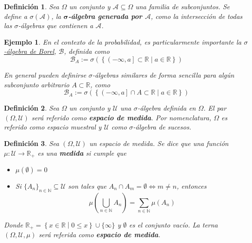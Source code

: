 \documentclass[12pt,letterpaper]{book}
\newtheorem{definicion}{Definición}[chapter]
\newtheorem{ejemplo}{Ejemplo}[chapter]
\newcommand{\R}{\mathbb{R}}
\newcommand{\talque}{\mathrel{}\middle|\mathrel{}}
\begin{document}
\begin{definicion}
Sea $\Omega$ un conjunto y $\mathcal{A} \subseteq \Omega$ una familia de subconjuntos. Se define a $\sigma(\mathcal{A})$, la \textbf{$\boldsymbol{\sigma}$-álgebra generada por $\boldsymbol{\mathcal{A}}$}, como la intersección de todas las $\sigma$-álgebras que contienen a $\mathcal{A}$.
\end{definicion}

\begin{ejemplo}
En el contexto de la probabilidad, es particularmente importante la \underline{$\sigma$-álgebra de Borel}, $\mathcal{B}$, definida como
\begin{equation}
\mathcal{B}_A := \sigma\left( \left\{ \left( -\infty , a \right] \subset \R \talque a\in \R \right\} \right)
\end{equation}

En general pueden definirse $\sigma$-álgebras similares de forma sencilla para algún subconjunto arbitrario $A \subset \R$, como
\begin{equation}
\mathcal{B}_A := \sigma\left( \left\{ \left( -\infty , a \right] \cap A \subset \R \talque a\in \R \right\} \right)
\end{equation}
\end{ejemplo}

\begin{definicion}
Sea $\Omega$ un conjunto y $\mathcal{U}$ una $\sigma$-álgebra definida en $\Omega$. El par $(\Omega,\mathcal{U})$ será referido como \textbf{espacio de medida}. Por nomenclatura, $\Omega$ es referido como \textit{espacio muestral} y $\mathcal{U}$ como \textit{$\sigma$-álgebra de sucesos}.
\end{definicion}

\begin{definicion}%
Sea $(\Omega, \mathcal{U})$ un espacio de medida. Se dice que una función $\mu : \mathcal{U} \rightarrow \R_+$ es una \textbf{medida} si cumple que
\begin{itemize}
\item $\mu(\emptyset) = 0$
\item Si $\{ A_n \}_{n\in \mathbb{N}} \subseteq \mathcal{U}$ son tales que $A_n \cap A_m = \emptyset \Leftrightarrow m\neq n$, entonces 
\begin{equation}
\mu\left( \bigcup_{n\in \mathbb{N}} A_n \right) = \sum_{n\in \mathbb{N}} \mu(A_n)
\end{equation}
\end{itemize}
Donde $\R_+ = \left\{ x\in \R \talque 0 \leq x \right\} \cup \{ \infty \}$ y $\emptyset$ es el conjunto vacío. La terna $(\Omega,\mathcal{U},\mu)$ será referida como \textbf{espacio de medida}.
\label{medida}
\end{definicion}
\end{document}
